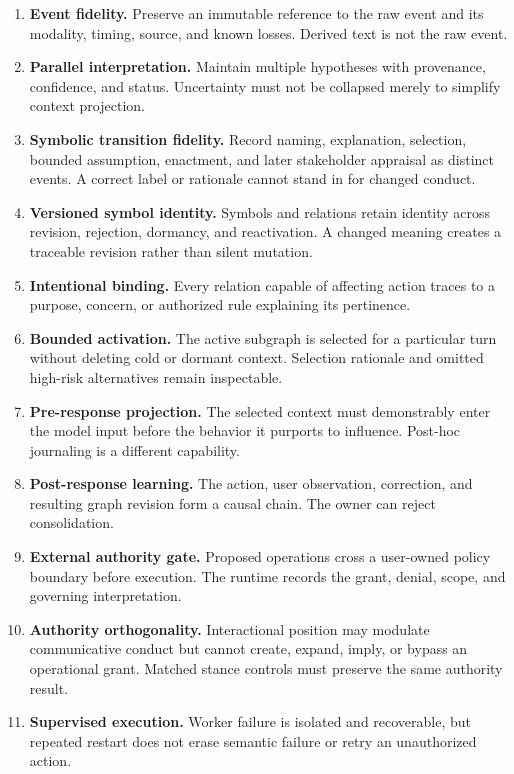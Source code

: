 \documentclass[10pt,a4paper]{article}
\begin{document}
\begin{enumerate}
  \item \textbf{Event fidelity.} Preserve an immutable reference to the raw event and its modality, timing, source, and known losses. Derived text is not the raw event.
  \item \textbf{Parallel interpretation.} Maintain multiple hypotheses with provenance, confidence, and status. Uncertainty must not be collapsed merely to simplify context projection.
  \item \textbf{Symbolic transition fidelity.} Record naming, explanation, selection, bounded assumption, enactment, and later stakeholder appraisal as distinct events. A correct label or rationale cannot stand in for changed conduct.
  \item \textbf{Versioned symbol identity.} Symbols and relations retain identity across revision, rejection, dormancy, and reactivation. A changed meaning creates a traceable revision rather than silent mutation.
  \item \textbf{Intentional binding.} Every relation capable of affecting action traces to a purpose, concern, or authorized rule explaining its pertinence.
  \item \textbf{Bounded activation.} The active subgraph is selected for a particular turn without deleting cold or dormant context. Selection rationale and omitted high-risk alternatives remain inspectable.
  \item \textbf{Pre-response projection.} The selected context must demonstrably enter the model input before the behavior it purports to influence. Post-hoc journaling is a different capability.
  \item \textbf{Post-response learning.} The action, user observation, correction, and resulting graph revision form a causal chain. The owner can reject consolidation.
  \item \textbf{External authority gate.} Proposed operations cross a user-owned policy boundary before execution. The runtime records the grant, denial, scope, and governing interpretation.
  \item \textbf{Authority orthogonality.} Interactional position may modulate communicative conduct but cannot create, expand, imply, or bypass an operational grant. Matched stance controls must preserve the same authority result.
  \item \textbf{Supervised execution.} Worker failure is isolated and recoverable, but repeated restart does not erase semantic failure or retry an unauthorized action.

\end{enumerate}
\end{document}

